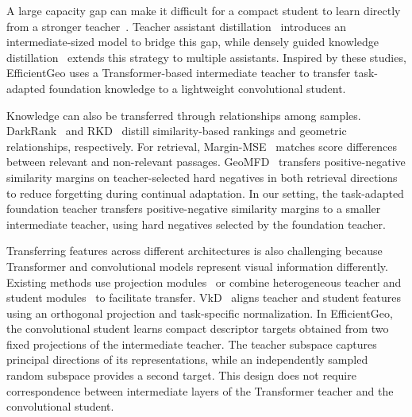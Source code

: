 A large capacity gap can make it difficult for a compact student to learn directly from a stronger teacher~\cite{cho2019efficacy}. Teacher assistant distillation~\cite{mirzadeh2020takd} introduces an intermediate-sized model to bridge this gap, while densely guided knowledge distillation~\cite{son2021dgkd} extends this strategy to multiple assistants. Inspired by these studies, EfficientGeo uses a Transformer-based intermediate teacher to transfer task-adapted foundation knowledge to a lightweight convolutional student.

Knowledge can also be transferred through relationships among samples. DarkRank~\cite{chen2018darkrank} and RKD~\cite{park2019rkd} distill similarity-based rankings and geometric relationships, respectively. For retrieval, Margin-MSE~\cite{hofstatter2020marginmse} matches score differences between relevant and non-relevant passages. GeoMFD~\cite{chen2026geomfd} transfers positive-negative similarity margins on teacher-selected hard negatives in both retrieval directions to reduce forgetting during continual adaptation. In our setting, the task-adapted foundation teacher transfers positive-negative similarity margins to a smaller intermediate teacher, using hard negatives selected by the foundation teacher.

Transferring features across different architectures is also challenging because Transformer and convolutional models represent visual information differently. Existing methods use projection modules~\cite{liu2022crossarchitecture,hao2023ofa} or combine heterogeneous teacher and student modules~\cite{li2025fbt} to facilitate transfer. VkD~\cite{miles2024vkd} aligns teacher and student features using an orthogonal projection and task-specific normalization. In EfficientGeo, the convolutional student learns compact descriptor targets obtained from two fixed projections of the intermediate teacher. The teacher subspace captures principal directions of its representations, while an independently sampled random subspace provides a second target. This design does not require correspondence between intermediate layers of the Transformer teacher and the convolutional student.
